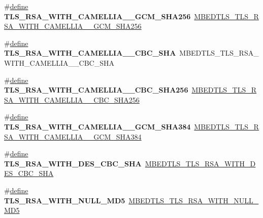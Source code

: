\begin{DoxyCompactItemize}
\#\hyperlink{structdefine}{define} {\bfseries T\+L\+S\+\_\+\+R\+S\+A\+\_\+\+W\+I\+T\+H\+\_\+\+C\+A\+M\+E\+L\+L\+I\+A\+\_\+\_\+\+G\+C\+M\+\_\+\+S\+H\+A256}~\hyperlink{ssl__ciphersuites_8h_aed15c4b5481cd4bc67761e97b7cb6501}{M\+B\+E\+D\+T\+L\+S\+\_\+\+T\+L\+S\+\_\+\+R\+S\+A\+\_\+\+W\+I\+T\+H\+\_\+\+C\+A\+M\+E\+L\+L\+I\+A\+\_\+\_\+\+G\+C\+M\+\_\+\+S\+H\+A256}
\item 
\mbox{\label{compat-1_83_8h_a774157bfc8458b05d824d7daaee77fd9}} 
\#\hyperlink{structdefine}{define} {\bfseries T\+L\+S\+\_\+\+R\+S\+A\+\_\+\+W\+I\+T\+H\+\_\+\+C\+A\+M\+E\+L\+L\+I\+A\+\_\+\_\+\+C\+B\+C\+\_\+\+S\+HA}~M\+B\+E\+D\+T\+L\+S\+\_\+\+T\+L\+S\+\_\+\+R\+S\+A\+\_\+\+W\+I\+T\+H\+\_\+\+C\+A\+M\+E\+L\+L\+I\+A\+\_\+\_\+\+C\+B\+C\+\_\+\+S\+HA
\item 
\mbox{\label{compat-1_83_8h_a2f0a30925335e5a19031ca373b06d203}} 
\#\hyperlink{structdefine}{define} {\bfseries T\+L\+S\+\_\+\+R\+S\+A\+\_\+\+W\+I\+T\+H\+\_\+\+C\+A\+M\+E\+L\+L\+I\+A\+\_\+\_\+\+C\+B\+C\+\_\+\+S\+H\+A256}~\hyperlink{ssl__ciphersuites_8h_a42c937825e6b46fd44c6d00d17f56506}{M\+B\+E\+D\+T\+L\+S\+\_\+\+T\+L\+S\+\_\+\+R\+S\+A\+\_\+\+W\+I\+T\+H\+\_\+\+C\+A\+M\+E\+L\+L\+I\+A\+\_\+\_\+\+C\+B\+C\+\_\+\+S\+H\+A256}
\item 
\mbox{\label{compat-1_83_8h_a42181f221d3388b83683bf2c5ae7817b}} 
\#\hyperlink{structdefine}{define} {\bfseries T\+L\+S\+\_\+\+R\+S\+A\+\_\+\+W\+I\+T\+H\+\_\+\+C\+A\+M\+E\+L\+L\+I\+A\+\_\+\_\+\+G\+C\+M\+\_\+\+S\+H\+A384}~\hyperlink{ssl__ciphersuites_8h_af70c7bcb65f88c35736c908b17f0b50e}{M\+B\+E\+D\+T\+L\+S\+\_\+\+T\+L\+S\+\_\+\+R\+S\+A\+\_\+\+W\+I\+T\+H\+\_\+\+C\+A\+M\+E\+L\+L\+I\+A\+\_\+\_\+\+G\+C\+M\+\_\+\+S\+H\+A384}
\item 
\mbox{\label{compat-1_83_8h_a77965fee468e98b2e5392a7a2d8267dc}} 
\#\hyperlink{structdefine}{define} {\bfseries T\+L\+S\+\_\+\+R\+S\+A\+\_\+\+W\+I\+T\+H\+\_\+\+D\+E\+S\+\_\+\+C\+B\+C\+\_\+\+S\+HA}~\hyperlink{ssl__ciphersuites_8h_a0bc0aa3876b0641040b9b33a8453386d}{M\+B\+E\+D\+T\+L\+S\+\_\+\+T\+L\+S\+\_\+\+R\+S\+A\+\_\+\+W\+I\+T\+H\+\_\+\+D\+E\+S\+\_\+\+C\+B\+C\+\_\+\+S\+HA}
\item 
\mbox{\label{compat-1_83_8h_a2b7974fbefcbd84e79eb861e349dda79}} 
\#\hyperlink{structdefine}{define} {\bfseries T\+L\+S\+\_\+\+R\+S\+A\+\_\+\+W\+I\+T\+H\+\_\+\+N\+U\+L\+L\+\_\+\+M\+D5}~\hyperlink{ssl__ciphersuites_8h_af584d987ca8d2fbd8634bb2ec4a29a76}{M\+B\+E\+D\+T\+L\+S\+\_\+\+T\+L\+S\+\_\+\+R\+S\+A\+\_\+\+W\+I\+T\+H\+\_\+\+N\+U\+L\+L\+\_\+\+M\+D5}

\end{DoxyCompactItemize}

